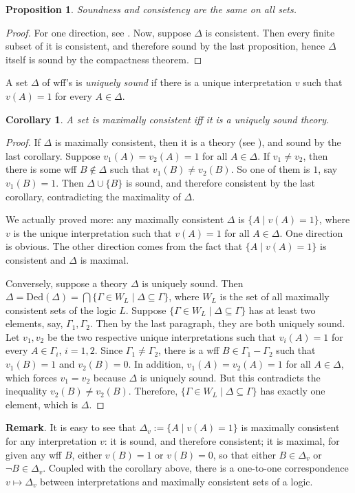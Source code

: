 \documentclass[12pt]{article}
\newtheorem{prop}{Proposition}
\newtheorem{cor}{Corollary}
\begin{document}
\begin{prop} Soundness and consistency are the same on all sets. \end{prop}
\begin{proof} For one direction, see .  Now, suppose $\Delta$ is consistent. Then every finite subset of it is consistent, and therefore sound by the last proposition, hence $\Delta$ itself is sound by the compactness theorem.  \end{proof}

A set $\Delta$ of wff's is \emph{uniquely sound} if there is a unique interpretation $v$ such that $v(A)=1$ for every $A \in \Delta$.

\begin{cor} A set is maximally consistent iff it is a uniquely sound theory. \end{cor}
\begin{proof}  If $\Delta$ is maximally consistent, then it is a theory (see ), and sound by the last corollary.  Suppose $v_1(A)=v_2(A)=1$ for all $A\in\Delta$.  If $v_1\ne v_2$, then there is some wff $B\notin \Delta$ such that $v_1(B)\ne v_2(B)$.  So one of them is $1$, say $v_1(B)=1$.  Then $\Delta\cup \lbrace B\rbrace$ is sound, and therefore consistent by the last corollary, contradicting the maximality of $\Delta$.

We actually proved more: any maximally consistent $\Delta$ is $\lbrace A \mid v(A)=1 \rbrace$, where $v$ is the unique interpretation such that $v(A)=1$ for all $A\in \Delta$.  One direction is obvious.  The other direction comes from the fact that $\lbrace A \mid v(A)=1 \rbrace$ is consistent and $\Delta$ is maximal.

Conversely, suppose a theory $\Delta$ is uniquely sound.  Then $\Delta=\mbox{Ded}(\Delta)=\bigcap \lbrace \Gamma \in W_L \mid \Delta\subseteq \Gamma\rbrace$, where $W_L$ is the set of all maximally consistent sets of the logic $L$.  Suppose $\lbrace \Gamma \in W_L \mid \Delta\subseteq \Gamma\rbrace$ has at least two elements, say, $\Gamma_1,\Gamma_2$.  Then by the last paragraph, they are both uniquely sound.  Let $v_1,v_2$ be the two respective unique interpretations such that $v_i(A)=1$ for every $A\in \Gamma_i$, $i=1,2$.  Since $\Gamma_1\ne \Gamma_2$, there is a wff $B\in \Gamma_1 -\Gamma_2$ such that $v_1(B)=1$ and $v_2(B)=0$.  In addition, $v_1(A)=v_2(A)=1$ for all $A\in \Delta$, which forces $v_1=v_2$ because $\Delta$ is uniquely sound.  But this contradicts the inequality $v_2(B)\ne v_2(B)$.  Therefore, $\lbrace \Gamma \in W_L \mid \Delta\subseteq \Gamma\rbrace$ has exactly one element, which is $\Delta$.
\end{proof}

\textbf{Remark}.  It is easy to see that $\Delta_v:=\lbrace A\mid v(A)=1\rbrace$ is maximally consistent for any interpretation $v$: it is sound, and therefore consistent; it is maximal, for given any wff $B$, either $v(B)=1$ or $v(B)=0$, so that either $B\in \Delta_v$ or $\neg B\in \Delta_v$.  Coupled with the corollary above, there is a one-to-one correspondence $v\mapsto \Delta_v$ between interpretations and maximally consistent sets of a logic.

\end{document}
